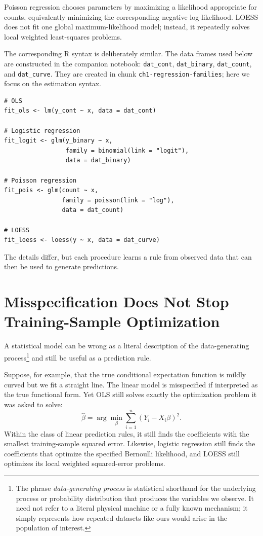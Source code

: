 \documentclass[11pt]{report}
\begin{document}
Poisson regression chooses parameters by maximizing a likelihood appropriate for counts, equivalently minimizing the corresponding negative log-likelihood. LOESS does not fit one global maximum-likelihood model; instead, it repeatedly solves local weighted least-squares problems.

The corresponding R syntax is deliberately similar. The data frames used below are constructed in the companion notebook: \texttt{dat\_cont}, \texttt{dat\_binary}, \texttt{dat\_count}, and \texttt{dat\_curve}. They are created in chunk \texttt{ch1-regression-families}; here we focus on the estimation syntax.

\begin{lstlisting}
# OLS
fit_ols <- lm(y_cont ~ x, data = dat_cont)

# Logistic regression
fit_logit <- glm(y_binary ~ x,
                 family = binomial(link = "logit"),
                 data = dat_binary)

# Poisson regression
fit_pois <- glm(count ~ x,
                family = poisson(link = "log"),
                data = dat_count)

# LOESS
fit_loess <- loess(y ~ x, data = dat_curve)
\end{lstlisting}

The details differ, but each procedure learns a rule from observed data that can then be used to generate predictions.

\section{Misspecification Does Not Stop Training-Sample Optimization}

A statistical model can be wrong as a literal description of the data-generating process\footnote{The phrase \emph{data-generating process} is statistical shorthand for the underlying process or probability distribution that produces the variables we observe. It need not refer to a literal physical machine or a fully known mechanism; it simply represents how repeated datasets like ours would arise in the population of interest.} and still be useful as a prediction rule.

Suppose, for example, that the true conditional expectation function is mildly curved but we fit a straight line. The linear model is misspecified if interpreted as the true functional form. Yet OLS still solves exactly the optimization problem it was asked to solve:
\[
\widehat{\beta}
=
\arg\min_{\beta}
\sum_{i=1}^{n}(Y_i-X_i\beta)^2.
\]
Within the class of linear prediction rules, it still finds the coefficients with the smallest training-sample squared error. Likewise, logistic regression still finds the coefficients that optimize the specified Bernoulli likelihood, and LOESS still optimizes its local weighted squared-error problems.
\end{document}
